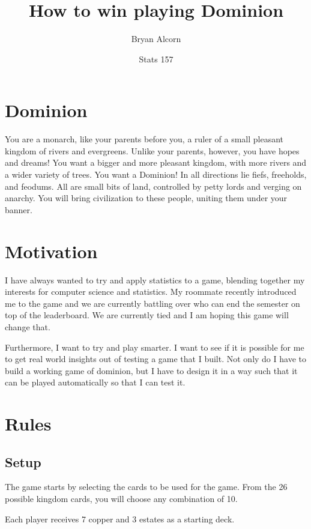 \documentclass[11pt, oneside]{article}   	%
\title{How to win playing Dominion}
\author{Bryan Alcorn}
\date{Stats 157}							%
\begin{document}
\maketitle

\section{Dominion}

You are a monarch, like your parents before you, a ruler of a small pleasant kingdom of rivers and evergreens.
Unlike your parents, however, you have hopes and dreams!
You want a bigger and more pleasant kingdom, with more rivers and a wider variety of trees.
You want a Dominion! In all directions lie fiefs, freeholds, and feodums.
All are small bits of land, controlled by petty lords and verging on anarchy.
You will bring civilization to these people, uniting them under your banner.

\section{Motivation}

I have always wanted to try and apply statistics to a game, blending together my interests for computer science and statistics. My roommate recently introduced me to the game and we are currently battling over who can end the semester on top of the leaderboard. We are currently tied and I am hoping this game will change that. 

Furthermore, I want to try and play smarter. I want to see if it is possible for me to get real world insights out of testing a game that I built. Not only do I have to build a working game of dominion, but I have to design it in a way such that it can be played automatically so that I can test it. 

\section{Rules}

\subsection{Setup}

The game starts by selecting the cards to be used for the game. From the 26 possible kingdom cards, you will choose any combination of 10. 

Each player receives 7 copper and 3 estates as a starting deck.
\end{document}
